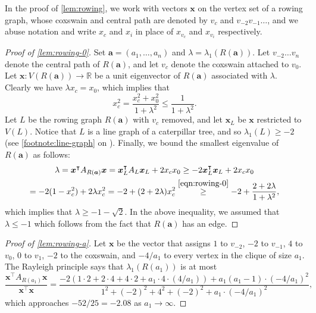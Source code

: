 \documentclass[11pt]{article}
\theoremstyle{definition}
\theoremstyle{remark}
\newcommand{\la}{\lambda}
\newcommand{\R}{\mathbb{R}}
\newcommand{\ba}{\bm{a}}
\newcommand{\bx}{\bm{x}}
\begin{document}
In the proof of \cref{lem:rowing}, we work with vectors $\bx$ on the vertex set of a rowing graph, whose coxswain and central path are denoted by $v_c$ and $v_{-2}v_{-1} \dots$, and we abuse notation and write $x_c$ and $x_i$ in place of $x_{v_c}$ and $x_{v_i}$ respectively.

\begin{proof}[Proof of \ref{lem:rowing-0}]
    Set $\ba = (a_1, \dots, a_n)$ and $\la = \la_1(R(\ba))$. Let $v_{-2} \dots v_n$ denote the central path of $R(\ba)$, and let $v_c$ denote the coxswain attached to $v_0$. Let $\bx\colon V(R(\ba)) \to \R$ be a unit eigenvector of $R(\ba)$ associated with $\la$. Clearly we have $\la x_c = x_0$, which implies that
    \begin{equation} \label{eqn:rowing-0}
        x_c^2 = \frac{x_c^2 + x_0^2}{1+\la^2} \le \frac{1}{1+\la^2}.
    \end{equation}
    Let $L$ be the rowing graph $R(\ba)$ with $v_c$ removed, and let $\bx_L$ be $\bx$ restricted to $V(L)$. Notice that $L$ is a line graph of a caterpillar tree, and so $\la_1(L) \ge -2$ (see \cref{footnote:line-graph} on ). Finally, we bound the smallest eigenvalue of $R(\ba)$ as follows:
    \begin{multline*}
        \la = \bx^\intercal A_{R(\ba)} \bx = \bx_L^\intercal A_L \bx_L + 2x_cx_0 \ge -2\bx_L^\intercal \bx_L + 2x_cx_0 \\
        = -2(1-x_c^2) + 2\la x_c^2 = -2+(2+2\la)x_c^2 \stackrel{\eqref{eqn:rowing-0}}{\ge} -2 + \frac{2+2\la}{1+\la^2},
    \end{multline*}
    which implies that $\la \ge -1-\sqrt{2}$. In the above inequality, we assumed that $\la \le -1$ which follows from the fact that $R(\ba)$ has an edge.
\end{proof}

\begin{proof}[Proof of \ref{lem:rowing-a}]
    Let $\bx$ be the vector that assigns $1$ to $v_{-2}$, $-2$ to $v_{-1}$, $4$ to $v_0$, $0$ to $v_1$, $-2$ to the coxswain, and $-4/a_1$ to every vertex in the clique of size $a_1$. The Rayleigh principle says that $\la_1(R(a_1))$ is at most
    \[
        \frac{\bx^\intercal A_{R(a_1)} \bx}{\bx^\intercal \bx} = \frac{-2(1 \cdot 2 + 2 \cdot 4 + 4 \cdot 2 + a_1 \cdot 4 \cdot (4/a_1)) + a_1(a_1-1) \cdot (-4/a_1)^2}{1^2 + (-2)^2 + 4^2 + (-2)^2 + a_1 \cdot (-4/a_1)^2},
    \]
    which approaches $-52/25 = -2.08$ as $a_1 \to \infty$.
\end{proof}
\end{document}
